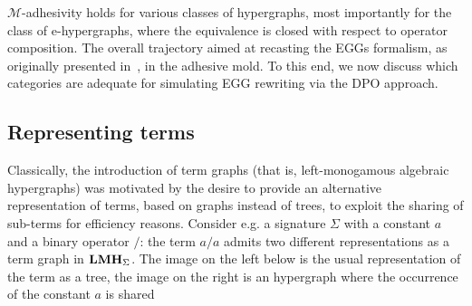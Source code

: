 \documentclass[3p]{elsarticle}
\newcommand{\catname}[1]{\textbf{\textup{#1}}}
\newcommand{\lmo}{\catname{LMH}}
\theoremstyle{remark}
\theoremstyle{definition}
\begin{document}
$\mathcal{M}$-adhesivity holds for various classes of hypergraphs, 
most importantly for the class of e-hypergraphs,
where the equivalence is closed with respect to operator composition.
%
The overall trajectory aimed at recasting the EGGs formalism, 
as originally presented in~\cite{WillseyNWFTP21}, in the adhesive mold.
To this end, we now discuss which categories are adequate for 
simulating EGG rewriting via the DPO approach.
%

\subsection{Representing terms} 
Classically, the introduction of term graphs (that is, left-monogamous algebraic hypergraphs) was motivated
by the desire to provide an alternative representation of terms, based on graphs 
instead of trees,  to exploit the sharing of sub-terms for efficiency reasons. Consider e.g. a signature $\Sigma$ 
with a constant $a$ and a binary operator $/$: the term $a / a$ admits two different representations 
as a term graph in $\lmo_{\Sigma}$. The image on the left below is the usual representation of the term as a tree, the 
image on the right is an hypergraph where the occurrence of the constant $a$ is shared
\end{document}

